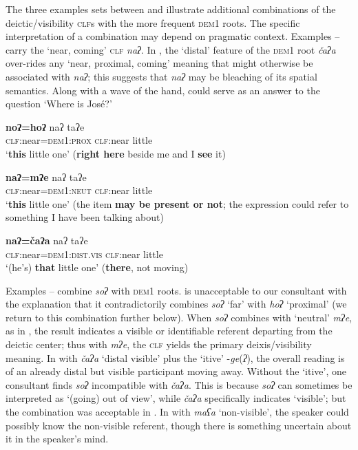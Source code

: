\documentclass[output=paper,colorlinks,citecolor=brown]{langscibook}
\begin{document}
The three examples sets between  and  illustrate additional combinations of the deictic/visibility \textsc{clf}s with the more frequent \textsc{dem1} roots. The specific interpretation of a combination may depend on pragmatic context. Examples – carry the ‘near, coming’ \textsc{clf} \textit{naʔ}. In , the ‘distal’ feature of the \textsc{dem1} root \textit{čaʔa} over-rides any ‘near, proximal, coming’ meaning that might otherwise be associated with \textit{naʔ}; this suggests that \textit{naʔ} may be bleaching of its spatial semantics. Along with a wave of the hand,  could serve as an answer to the question ‘Where is José?’

\ea\label{ex:payne:42}
\gll  \textbf{noʔ=hoʔ}  naʔ  taʔe\\
 \textsc{clf}:near\textsc{=dem1:prox}  \textsc{clf}:near  little\\
\glt ‘\textbf{this} little one’ (\textbf{right here} beside me and I \textbf{see} it)
\z

\ea\label{ex:payne:43}
\gll  \textbf{naʔ=mʔe}  naʔ    taʔe\\
 \textsc{clf}:near\textsc{=dem1:neut}  \textsc{clf}:near  little\\
\glt ‘\textbf{this} little one’ (the item \textbf{may be present or not}; the expression could refer to something I have been talking about)
\z

\ea\label{ex:payne:44}
\gll  \textbf{naʔ=čaʔa}  naʔ  taʔe\\
 \textsc{clf}:near\textsc{=dem1:dist.vis} \textsc{clf}:near  little\\
\glt ‘(he’s) \textbf{that} little one’ (\textbf{there}, not moving)
\z

Examples – combine \textit{soʔ} with \textsc{dem1} roots.  is unacceptable to our consultant with the explanation that it contradictorily combines \textit{soʔ} ‘far’ with \textit{hoʔ} ‘proximal’ (we return to this combination further below). When \textit{soʔ} combines with ‘neutral’ \textit{mʔe}, as in , the result indicates a visible or identifiable referent departing from the deictic center; thus with \textit{mʔe}, the \textsc{clf} yields the primary deixis/visibility meaning. In  with \textit{čaʔa} ‘distal visible’ plus the ‘itive’ -\textit{ge}(\textit{ʔ}), the overall reading is of an already distal but visible participant moving away. Without the ‘itive’, one consultant finds \textit{soʔ} incompatible with \textit{čaʔa}. This is because \textit{soʔ} can sometimes be interpreted as ‘(going) out of view’, while \textit{čaʔa} specifically indicates ‘visible’; but the combination was acceptable in . In  with \textit{maʕa} ‘non-visible’, the speaker could possibly know the non-visible referent, though there is something uncertain about it in the speaker’s mind.
\end{document}
